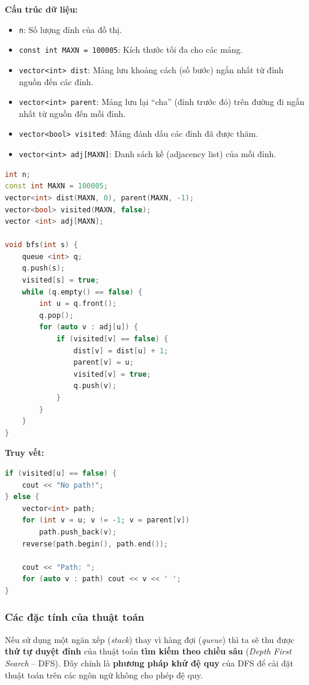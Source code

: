 \documentclass{article}
\begin{document}
\textbf{Cấu trúc dữ liệu:}
\begin{itemize}
    \item \texttt{n}: Số lượng đỉnh của đồ thị.
    \item \texttt{const int MAXN = 100005}: Kích thước tối đa cho các mảng.
    \item \texttt{vector<int> dist}: Mảng lưu khoảng cách (số bước) ngắn nhất từ đỉnh nguồn đến các đỉnh.
    \item \texttt{vector<int> parent}: Mảng lưu lại ``cha'' (đỉnh trước đó) trên đường đi ngắn nhất từ nguồn đến mỗi đỉnh.
    \item \texttt{vector<bool> visited}: Mảng đánh dấu các đỉnh đã được thăm.
    \item \texttt{vector<int> adj[MAXN]}: Danh sách kề (adjacency list) của mỗi đỉnh.
\end{itemize}

\begin{lstlisting}[language=C++, caption={Cài đặt}]
int n; 
const int MAXN = 100005;
vector<int> dist(MAXN, 0), parent(MAXN, -1);
vector<bool> visited(MAXN, false);
vector <int> adj[MAXN];

void bfs(int s) { 
    queue <int> q;
    q.push(s);
    visited[s] = true;
    while (q.empty() == false) {
        int u = q.front();
        q.pop();
        for (auto v : adj[u]) {
            if (visited[v] == false) {
                dist[v] = dist[u] + 1;
                parent[v] = u;
                visited[v] = true;
                q.push(v);
            }
        }
    }
}
\end{lstlisting}

\textbf{Truy vết:}
\begin{lstlisting}[language=C++, caption={Cài đặt truy vết đường đi từ đỉnh nguồn $s$ đến đỉnh $u$}]
if (visited[u] == false) {
    cout << "No path!";
} else {
    vector<int> path;
    for (int v = u; v != -1; v = parent[v])
        path.push_back(v);
    reverse(path.begin(), path.end());

    cout << "Path: ";
    for (auto v : path) cout << v << ' ';
}
\end{lstlisting}

\subsubsection{Các đặc tính của thuật toán}

Nếu sử dụng một ngăn xếp (\textit{stack}) thay vì hàng đợi (\textit{queue}) thì ta sẽ thu được \textbf{thứ tự duyệt đỉnh} của thuật toán \textbf{tìm kiếm theo chiều sâu} (\textit{Depth First Search} -- DFS). Đây chính là \textbf{phương pháp khử đệ quy} của DFS để cài đặt thuật toán trên các ngôn ngữ không cho phép đệ quy.
\end{document}
